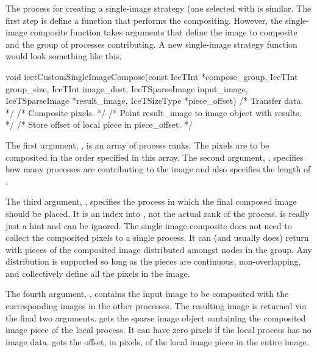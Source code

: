 The process for creating a single-image strategy (one selected with
 is similar.  The first step is define a
function that performs the compositing.  However, the single-image
composite function takes arguments that define the image to composite and
the group of processes contributing.  A new single-image strategy function
would look something like this.

\begin{code}
void icetCustomSingleImageCompose(const IceTInt *compose_group,
                                  IceTInt group_size,
                                  IceTInt image_dest,
                                  IceTSparseImage input_image,
                                  IceTSparseImage *result_image,
                                  IceTSizeType *piece_offset)
{
    /* Transfer data. */
    /* Composite pixels. */
    /* Point result_image to image object with results. */
    /* Store offset of local piece in piece_offset. */
}
\end{code}

The first argument, , is an array of process ranks.
The pixels are to be composited in the order specified in this array.  The
second argument, , specifies how many processes are
contributing to the image and also specifies the length of
.

The third argument, , specifies the process in which the
final composed image should be placed.  It is an index into
, not the actual rank of the process.
 is really just a hint and can be ignored.  The single
image composite does not need to collect the composited pixels to a single
process.  It can (and usually does) return with pieces of the composited
image distributed amongst nodes in the group.  Any distribution is
supported so long as the pieces are continuous, non-overlapping, and
collectively define all the pixels in the image.

The fourth argument, , contains the input image to be
composited with the corresponding images in the other processes.  The
resulting image is returned via the final two arguments.
 gets the sparse image object containing the composited
image piece of the local process.  It can have zero pixels if the local
process has no image data.   gets the offset, in pixels,
of the local image piece in the entire image.

